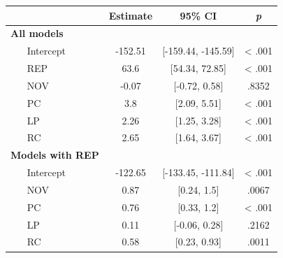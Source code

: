 \begin{tabular}{llccc}
\hline
 &  & Estimate & 95\% CI & \textit{p} \\
\hline
\multicolumn{2}{l}{\textbf{All models}} & \multicolumn{1}{l}{} & \multicolumn{1}{l}{} & \multicolumn{1}{l}{} \\
 & Intercept & -152.51 & {[}-159.44, -145.59{]} & \textless{} .001 \\
 & REP & 63.6 & {[}54.34, 72.85{]} & \textless{} .001 \\
 & NOV & -0.07 & {[}-0.72, 0.58{]} & .8352 \\
 & PC & 3.8 & {[}2.09, 5.51{]} & \textless{} .001 \\
 & LP & 2.26 & {[}1.25, 3.28{]} & \textless{} .001 \\
 & RC & 2.65 & {[}1.64, 3.67{]} & \textless{} .001 \\
\multicolumn{2}{l}{\textbf{Models with REP}} & \multicolumn{1}{l}{} & \multicolumn{1}{l}{} & \multicolumn{1}{l}{} \\
 & Intercept & -122.65 & {[}-133.45, -111.84{]} & \textless{} .001 \\
 & NOV & 0.87 & {[}0.24, 1.5{]} & .0067 \\
 & PC & 0.76 & {[}0.33, 1.2{]} & \textless{} .001 \\
 & LP & 0.11 & {[}-0.06, 0.28{]} & .2162 \\
 & RC & 0.58 & {[}0.23, 0.93{]} & .0011 \\
\hline
\end{tabular}
